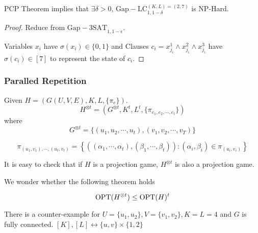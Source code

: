 \begin{claim}
    PCP Theorem implies that  $ \exists \delta>0 $,  $ \mathrm{Gap-LC}_{1,1-\delta}^{(K,L)=(2,7)} $ is NP-Hard.  
\end{claim}
\begin{proof}
    Reduce from  $ \mathrm{Gap-3SAT}_{1,1-\epsilon} $. 

        \begin{center}
        \end{center}

        Variables  $ x_i $ have  $ \sigma(x_i)\in \{0,1\} $ and Clauses  $ c_i=x_{j_i}^1\wedge x_{j_i}^2\wedge x_{j_i}^3 $ have  $ \sigma(c_i)\in [7] $ to represent the state of  $ c_i $.
    \end{proof}

\subsubsection{Paralled Repetition}
Given  $ H=\left(G(U,V,E),K,L,\{\pi_e\}\right) $.
\[H^{\otimes t}=\left(G^{\otimes t},K^t,L^t,\{\pi_{e_1,e_2,\cdots,e_t}\}\right)\]
where 
\[G^{\otimes t}=\{(u_1,u_2,\cdots,u_t),(v_1,v_2,\cdots,v_T)\}\] 

\[\pi_{(u_1,v_1),\cdots,(u_t,v_t)}=\left\{\left((\alpha_1,\cdots,\alpha_t),(\beta_1,\cdots,\beta_t)\right):(\alpha_i,\beta_i)\in \pi_{(u_i,v_i)}\right\}\]

It is easy to check that if  $ H  $ is a projection game,  $ H^{\otimes t} $ is also a projection game.

We wonder whether the following theorem holds
\begin{theorem}
    \[\mathrm{OPT}(H^{\otimes t}) \leq \mathrm{OPT}(H)^t\]
\end{theorem}
There is a counter-example for  $ U=\{u_1,u_2\},V=\{v_1,v_2\},K=L=4 $ and  $ G $ is fully connected. 
$ [K],[L]\leftrightarrow \{u,v\}\times\{1,2\} $ 

